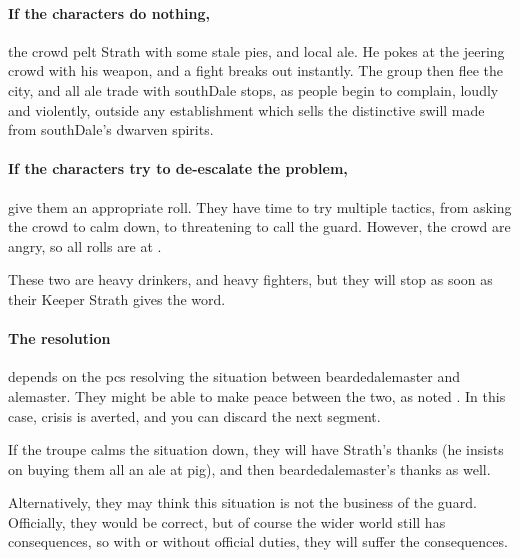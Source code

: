 \paragraph{If the characters do nothing,}
the crowd pelt Strath with some stale pies, and local ale.
He pokes at the jeering crowd with his weapon, and a fight breaks out instantly.
The group then flee the city, and all ale trade with \gls{southDale} stops, as people begin to complain, loudly and violently, outside any establishment which sells the distinctive swill made from \gls{southDale}'s dwarven spirits.

\paragraph{If the characters try to de-escalate the problem,}
give them an appropriate roll.
They have time to try multiple tactics, from asking the crowd to calm down, to threatening to call the guard.
However, the crowd are angry, so all rolls are at \tn[10].



These two are heavy drinkers, and heavy fighters, but they will stop as soon as their Keeper Strath gives the word.


\paragraph{The resolution}
depends on the \glspl{pc} resolving the situation between \gls{beardedalemaster} and \gls{alemaster}.
They might be able to make peace between the two, as noted .
In this case, crisis is averted, and you can discard the next \gls{segment}.

If the troupe calms the situation down, they will have Strath's thanks (he insists on buying them all an ale at \gls{pig}), and then \gls{beardedalemaster}'s thanks as well.

Alternatively, they may think this situation is not the business of the \gls{guard}.
Officially, they would be correct, but of course the wider world still has consequences, so with or without official duties, they will suffer the consequences.

\beardedalemaster

